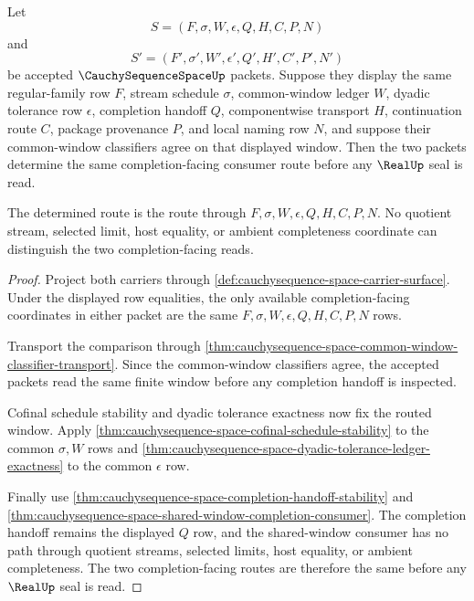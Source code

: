 \begin{theorem}
\label{thm:cauchysequence-space-shared-window-determinacy}
Let
$$
S=(F,\sigma,W,\epsilon,Q,H,C,P,N)
$$
and
$$
S'=(F',\sigma',W',\epsilon',Q',H',C',P',N')
$$
be accepted $\CauchySequenceSpaceUp$ packets. Suppose they display the same regular-family row $F$, stream schedule $\sigma$, common-window ledger $W$, dyadic tolerance row $\epsilon$, completion handoff $Q$, componentwise transport $H$, continuation route $C$, package provenance $P$, and local naming row $N$, and suppose their common-window classifiers agree on that displayed window. Then the two packets determine the same completion-facing consumer route before any $\RealUp$ seal is read.

The determined route is the route through $F,\sigma,W,\epsilon,Q,H,C,P,N$. No quotient stream, selected limit, host equality, or ambient completeness coordinate can distinguish the two completion-facing reads.
\end{theorem}
\begin{proof}
Project both carriers through \autoref{def:cauchysequence-space-carrier-surface}. Under the displayed row equalities, the only available completion-facing coordinates in either packet are the same $F,\sigma,W,\epsilon,Q,H,C,P,N$ rows.

Transport the comparison through \autoref{thm:cauchysequence-space-common-window-classifier-transport}. Since the common-window classifiers agree, the accepted packets read the same finite window before any completion handoff is inspected.

Cofinal schedule stability and dyadic tolerance exactness now fix the routed window. Apply \autoref{thm:cauchysequence-space-cofinal-schedule-stability} to the common $\sigma,W$ rows and \autoref{thm:cauchysequence-space-dyadic-tolerance-ledger-exactness} to the common $\epsilon$ row.

Finally use \autoref{thm:cauchysequence-space-completion-handoff-stability} and \autoref{thm:cauchysequence-space-shared-window-completion-consumer}. The completion handoff remains the displayed $Q$ row, and the shared-window consumer has no path through quotient streams, selected limits, host equality, or ambient completeness. The two completion-facing routes are therefore the same before any $\RealUp$ seal is read.
\end{proof}

